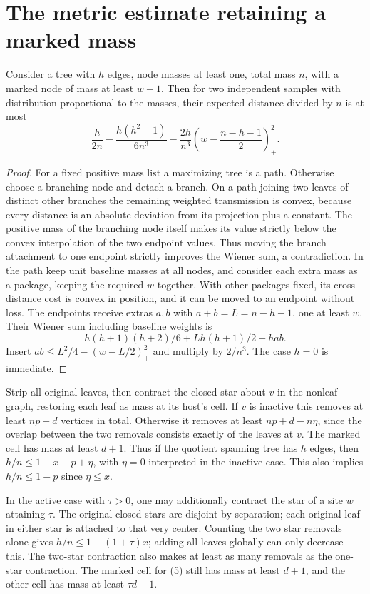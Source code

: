 \section{The metric estimate retaining a marked mass}
\begin{lemma}
Consider a tree with $h$ edges, node masses at least one, total mass $n$, with a marked node of mass at least $w+1$. Then for two independent samples with distribution proportional to the masses, their expected distance divided by $n$ is at most
\[
 \frac{h}{2n}-\frac{h(h^2-1)}{6n^3}
       -\frac{2h}{n^3}\left(w-\frac{n-h-1}{2}\right)_+^2 .
 \tag{5}
\]
\end{lemma}
\begin{proof}
For a fixed positive mass list a maximizing tree is a path. Otherwise choose a branching node and detach a branch. On a path joining two leaves of distinct other branches the remaining weighted transmission is convex, because every distance is an absolute deviation from its projection plus a constant. The positive mass of the branching node itself makes its value strictly below the convex interpolation of the two endpoint values. Thus moving the branch attachment to one endpoint strictly improves the Wiener sum, a contradiction. In the path keep unit baseline masses at all nodes, and consider each extra mass as a package, keeping the required $w$ together. With other packages fixed, its cross-distance cost is convex in position, and it can be moved to an endpoint without loss. The endpoints receive extras $a,b$ with $a+b=L=n-h-1$, one at least $w$. Their Wiener sum including baseline weights is
\[
 h(h+1)(h+2)/6+Lh(h+1)/2+hab.
\]
Insert $ab\le L^2/4-(w-L/2)_+^2$ and multiply by $2/n^3$. The case $h=0$ is immediate.
\end{proof}

Strip all original leaves, then contract the closed star about $v$ in the nonleaf graph, restoring each leaf as mass at its host's cell. If $v$ is inactive this removes at least $np+d$ vertices in total. Otherwise it removes at least $np+d-n\eta$, since the overlap between the two removals consists exactly of the leaves at $v$. The marked cell has mass at least $d+1$. Thus if the quotient spanning tree has $h$ edges, then $h/n\le1-x-p+\eta$, with $\eta=0$ interpreted in the inactive case. This also implies $h/n\le1-p$ since $\eta\le x$.

In the active case with $\tau>0$, one may additionally contract the star of a site $w$ attaining $\tau$. The original closed stars are disjoint by separation; each original leaf in either star is attached to that very center. Counting the two star removals alone gives $h/n\le1-(1+\tau)x$; adding all leaves globally can only decrease this. The two-star contraction also makes at least as many removals as the one-star contraction. The marked cell for (5) still has mass at least $d+1$, and the other cell has mass at least $\tau d+1$.

